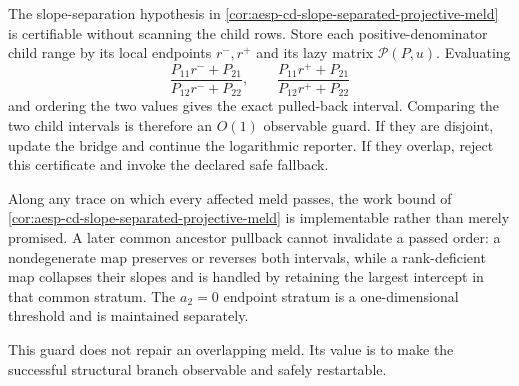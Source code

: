 \begin{corollary}
\label{cor:aesp-cd-projective-separation-guard}
The slope-separation hypothesis in
\cref{cor:aesp-cd-slope-separated-projective-meld} is certifiable without
scanning the child rows.  Store each positive-denominator child range by its
local endpoints $r^-,r^+$ and its lazy matrix $\mathcal P(P,u)$.  Evaluating
\begin{equation*}
 \frac{P_{11}r^-+P_{21}}{P_{12}r^-+P_{22}},\qquad
 \frac{P_{11}r^++P_{21}}{P_{12}r^++P_{22}}
\end{equation*}
and ordering the two values gives the exact pulled-back interval.  Comparing
the two child intervals is therefore an $O(1)$ observable guard.  If they are
disjoint, update the bridge and continue the logarithmic reporter.  If they
overlap, reject this certificate and invoke the declared safe fallback.

Along any trace on which every affected meld passes, the work bound of
\cref{cor:aesp-cd-slope-separated-projective-meld} is implementable rather
than merely promised.  A later common ancestor pullback cannot invalidate a
passed order: a nondegenerate map preserves or reverses both intervals, while
a rank-deficient map collapses their slopes and is handled by retaining the
largest intercept in that common stratum.  The $a_2=0$ endpoint stratum is a
one-dimensional threshold and is maintained separately.
\end{corollary}

This guard does not repair an overlapping meld.  Its value is to make the
successful structural branch observable and safely restartable.
